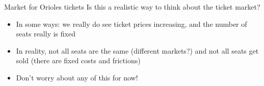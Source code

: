 \documentclass[compress]{beamer}
\begin{document}
\begin{frame}{Market for Orioles tickets}
    Is this a realistic way to think about the ticket market?
    \begin{itemize}
        \item In some ways: we really do see ticket prices increasing, and the number of seats really is fixed
        \item In reality, not all seats are the same (different markets?) and not all seats get sold (there are fixed costs and frictions)
        \item Don't worry about any of this for now!
    \end{itemize}
\end{frame}
\end{document}

